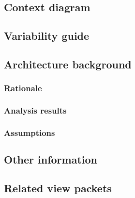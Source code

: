 \documentclass[a4paper,10pt]{report}
\begin{document}
\subsection{Context diagram}

\subsection{Variability guide}

\subsection{Architecture background}

\subsubsection{Rationale}

\subsubsection{Analysis results}

\subsubsection{Assumptions}

\subsection{Other information}

\subsection{Related view packets}
\end{document}
